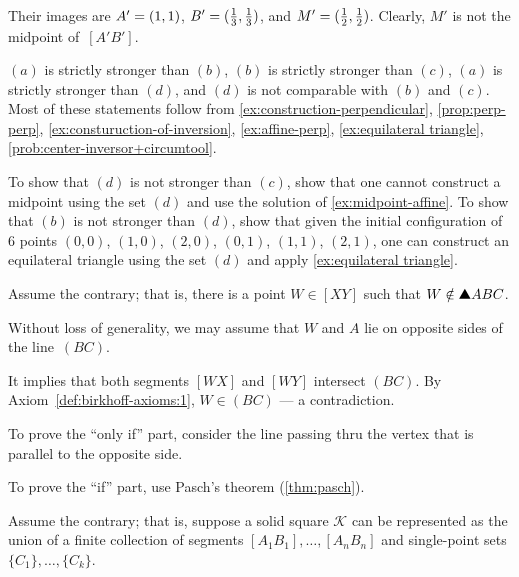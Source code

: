 Their images are $A'=(1,1)$, $B'=(\tfrac13,\tfrac13)$, and $M'=(\tfrac12,\tfrac12)$.
Clearly, $M'$ is not the midpoint of~$[A'B']$.


$(a)$ is strictly stronger than $(b)$,
$(b)$ is strictly stronger than $(c)$,
$(a)$ is strictly stronger than $(d)$,
and $(d)$ is not comparable with $(b)$ and $(c)$.
Most of these statements follow from \ref{ex:construction-perpendicular},
\ref{prop:perp-perp},
\ref{ex:consturuction-of-inversion},
\ref{ex:affine-perp},
\ref{ex:equilateral triangle}, 
\ref{prob:center-inversor+circumtool}.

To show that $(d)$ is not stronger than $(c)$, show that one cannot construct a midpoint using the set $(d)$ and use the solution of \ref{ex:midpoint-affine}.
To show that $(b)$ is not stronger than $(d)$, show that given the initial configuration of 6 points 
$(0,0)$, 
$(1,0)$,
$(2,0)$,
$(0,1)$, 
$(1,1)$,
$(2,1)$,
one can construct an equilateral triangle using the set $(d)$ and apply \ref{ex:equilateral triangle}.

\setcounter{eqtn}{0} 

Assume the contrary; 
that is, there is a point $W\in [XY]$ such that $W\notin\solidtriangle ABC$.

Without  loss of generality, we may assume that $W$ and $A$ lie on opposite sides of the line~$(BC)$.

It implies that both segments $[WX]$ and $[WY]$ intersect $(BC)$.
By Axiom~\ref{def:birkhoff-axioms:1}, $W\in (BC)$ --- a contradiction.


To prove the ``only if'' part, consider the line passing thru the vertex that is parallel to the opposite side.

To prove the ``if'' part, use Pasch's theorem (\ref{thm:pasch}).

Assume the contrary; that is, suppose a solid square \( \mathcal{K} \) can be represented as the union of a finite collection of segments \( [A_1B_1],\dots,[A_nB_n] \)
and single-point sets \( \{C_1\},\dots,\{C_k\} \).

